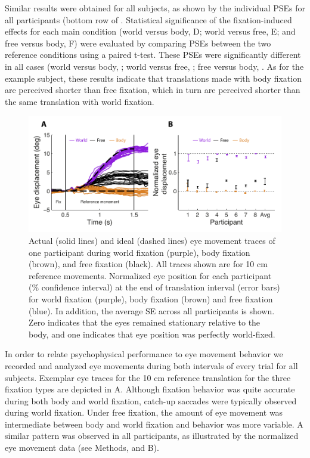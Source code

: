 Similar results were obtained for all subjects, as shown by the individual PSEs for all participants (bottom row of . Statistical significance of the fixation-induced effects for each main condition (world versus body, D; world versus free, E; and free versus body, F) were evaluated by comparing PSEs between the two reference conditions using a paired t-test. These PSEs were significantly different in all cases (world versus body, ; world versus free, ; free versus body, . As for the example subject, these results indicate that translations made with body fixation are perceived shorter than free fixation, which in turn are perceived shorter than the same translation with world fixation.

\begin{figure}
    \includegraphics[width=1.0\textwidth]{src/paper3/figure3.pdf}

    \caption{ Actual (solid lines) and ideal (dashed lines) eye movement traces of one participant during world fixation (purple), body fixation (brown), and free fixation (black). All traces shown are for 10 \si{\centi\metre} reference movements.  Normalized eye position for each participant (\% confidence interval) at the end of translation interval (error bars) for world fixation (purple), body fixation (brown) and free fixation (blue). In addition, the average {\textpm}SE across all participants is shown. Zero indicates that the eyes remained stationary relative to the body, and one indicates that eye position was perfectly world-fixed.}
    \label{p3:fig3}    
\end{figure}

In order to relate psychophysical performance to eye movement behavior we recorded and analyzed eye movements during both intervals of every trial for all subjects. Exemplar eye traces for the 10 \si{\centi\metre} reference translation for the three fixation types are depicted in A. Although fixation behavior was quite accurate during both body and world fixation, catch-up saccades were typically observed during world fixation. Under free fixation, the amount of eye movement was intermediate between body and world fixation and behavior was more variable. A similar pattern was observed in all participants, as illustrated by the normalized eye movement data (see Methods, and B).

